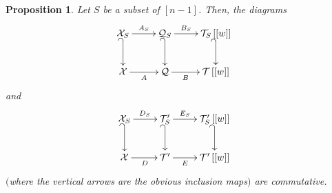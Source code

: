 \documentclass[11pt]{article}
\makeatletter
\newtheorem{Proposition}[Theorem]{Proposition}
\numberwithin{equation}{section}
\newcommand{\calX}{\mathcal{X}}
\newcommand{\calQ}{\mathcal{Q}}
\newcommand{\calT}{\mathcal{T}}
\newcommand{\arinj}{\ar@{_{(}->}}
\makeatother
\begin{document}
\begin{Proposition}\label{prop.pathless.cd}Let $S$ be a subset of $[n-1] $. Then,
the diagrams%
\begin{gather}\begin{split} &
\xymatrix{
\calX_S \arinj[d] \ar[r]^{A_S} & \calQ_S \arinj[d] \ar[r]^-{B_S}
& \calT_S\left[\left[w\right]\right] \arinj[d] \\
\calX\ar[r]_{A} & \calQ\ar[r]_-{B} & \calT\left[\left[w\right]\right]
}\end{split}
\label{eq.prop.pathless.cd.1}
\end{gather}
and%
\begin{gather}\begin{split}&
\xymatrix{
\calX_S \arinj[d] \ar[r]^{D_S} & \calT^\prime_S \arinj[d] \ar[r]^-{E_S}
& \calT^\prime_S\left[\left[w\right]\right] \arinj[d] \\
\calX\ar[r]_{D} & \calT^\prime\ar[r]_-{E} & \calT^\prime\left[\left
[w\right]\right]
}\end{split}
\label{eq.prop.pathless.cd.2}
\end{gather}
$($where the vertical arrows are the obvious inclusion maps$)$ are commutative.
\end{Proposition}
\end{document}
